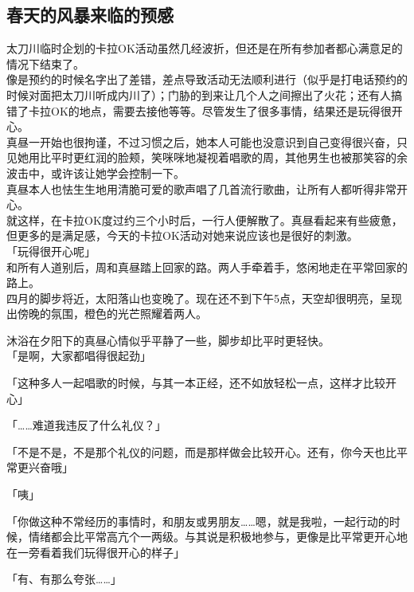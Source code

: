 \subsection{春天的风暴来临的预感}

太刀川临时企划的卡拉OK活动虽然几经波折，但还是在所有参加者都心满意足的情况下结束了。\\

像是预约的时候名字出了差错，差点导致活动无法顺利进行（似乎是打电话预约的时候对面把太刀川听成内川了）；门胁的到来让几个人之间擦出了火花；还有人搞错了卡拉OK的地点，需要去接他等等。尽管发生了很多事情，结果还是玩得很开心。\\

真昼一开始也很拘谨，不过习惯之后，她本人可能也没意识到自己变得很兴奋，只见她用比平时更红润的脸颊，笑咪咪地凝视着唱歌的周，其他男生也被那笑容的余波击中，或许该让她学会控制一下。\\

真昼本人也怯生生地用清脆可爱的歌声唱了几首流行歌曲，让所有人都听得非常开心。\\

就这样，在卡拉OK度过约三个小时后，一行人便解散了。真昼看起来有些疲惫，但更多的是满足感，今天的卡拉OK活动对她来说应该也是很好的刺激。\\

「玩得很开心呢」\\

和所有人道别后，周和真昼踏上回家的路。两人手牵着手，悠闲地走在平常回家的路上。\\

四月的脚步将近，太阳落山也变晚了。现在还不到下午5点，天空却很明亮，呈现出傍晚的氛围，橙色的光芒照耀着两人。

沐浴在夕阳下的真昼心情似乎平静了一些，脚步却比平时更轻快。\\

「是啊，大家都唱得很起劲」

「这种多人一起唱歌的时候，与其一本正经，还不如放轻松一点，这样才比较开心」

「……难道我违反了什么礼仪？」

「不是不是，不是那个礼仪的问题，而是那样做会比较开心。还有，你今天也比平常更兴奋哦」

「咦」

「你做这种不常经历的事情时，和朋友或男朋友……嗯，就是我啦，一起行动的时候，情绪都会比平常高亢个一两级。与其说是积极地参与，更像是比平常更开心地在一旁看着我们玩得很开心的样子」

「有、有那么夸张……」

